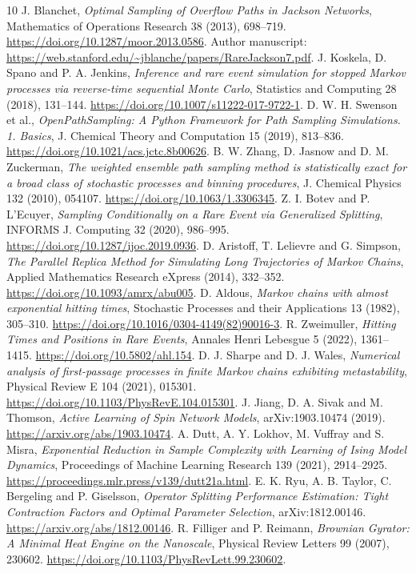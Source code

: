 \begin{thebibliography}{10}
\small
{} J. Blanchet, \emph{Optimal Sampling of Overflow Paths in Jackson Networks}, Mathematics of Operations Research 38 (2013), 698--719. \url{https://doi.org/10.1287/moor.2013.0586}. Author manuscript: \url{https://web.stanford.edu/~jblanche/papers/RareJackson7.pdf}.
 J. Koskela, D. Spano and P. A. Jenkins, \emph{Inference and rare event simulation for stopped Markov processes via reverse-time sequential Monte Carlo}, Statistics and Computing 28 (2018), 131--144. \url{https://doi.org/10.1007/s11222-017-9722-1}.
 D. W. H. Swenson et al., \emph{OpenPathSampling: A Python Framework for Path Sampling Simulations. 1. Basics}, J. Chemical Theory and Computation 15 (2019), 813--836. \url{https://doi.org/10.1021/acs.jctc.8b00626}.
 B. W. Zhang, D. Jasnow and D. M. Zuckerman, \emph{The weighted ensemble path sampling method is statistically exact for a broad class of stochastic processes and binning procedures}, J. Chemical Physics 132 (2010), 054107. \url{https://doi.org/10.1063/1.3306345}.
 Z. I. Botev and P. L'Ecuyer, \emph{Sampling Conditionally on a Rare Event via Generalized Splitting}, INFORMS J. Computing 32 (2020), 986--995. \url{https://doi.org/10.1287/ijoc.2019.0936}.
 D. Aristoff, T. Lelievre and G. Simpson, \emph{The Parallel Replica Method for Simulating Long Trajectories of Markov Chains}, Applied Mathematics Research eXpress (2014), 332--352. \url{https://doi.org/10.1093/amrx/abu005}.
 D. Aldous, \emph{Markov chains with almost exponential hitting times}, Stochastic Processes and their Applications 13 (1982), 305--310. \url{https://doi.org/10.1016/0304-4149(82)90016-3}.
 R. Zweimuller, \emph{Hitting Times and Positions in Rare Events}, Annales Henri Lebesgue 5 (2022), 1361--1415. \url{https://doi.org/10.5802/ahl.154}.
 D. J. Sharpe and D. J. Wales, \emph{Numerical analysis of first-passage processes in finite Markov chains exhibiting metastability}, Physical Review E 104 (2021), 015301. \url{https://doi.org/10.1103/PhysRevE.104.015301}.
 J. Jiang, D. A. Sivak and M. Thomson, \emph{Active Learning of Spin Network Models}, arXiv:1903.10474 (2019). \url{https://arxiv.org/abs/1903.10474}.
 A. Dutt, A. Y. Lokhov, M. Vuffray and S. Misra, \emph{Exponential Reduction in Sample Complexity with Learning of Ising Model Dynamics}, Proceedings of Machine Learning Research 139 (2021), 2914--2925. \url{https://proceedings.mlr.press/v139/dutt21a.html}.
 E. K. Ryu, A. B. Taylor, C. Bergeling and P. Giselsson, \emph{Operator Splitting Performance Estimation: Tight Contraction Factors and Optimal Parameter Selection}, arXiv:1812.00146. \url{https://arxiv.org/abs/1812.00146}.
 R. Filliger and P. Reimann, \emph{Brownian Gyrator: A Minimal Heat Engine on the Nanoscale}, Physical Review Letters 99 (2007), 230602. \url{https://doi.org/10.1103/PhysRevLett.99.230602}.
\end{thebibliography}
